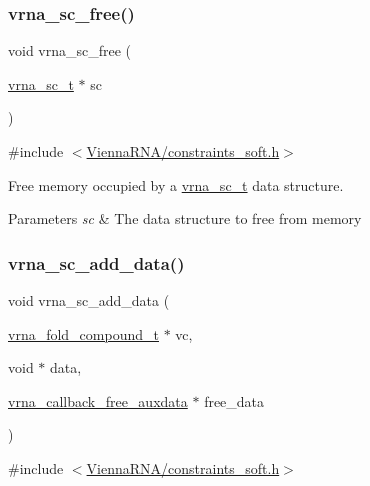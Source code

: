 \subsubsection{\texorpdfstring{vrna\+\_\+sc\+\_\+free()}{vrna\_sc\_free()}}
{\footnotesize\ttfamily void vrna\+\_\+sc\+\_\+free (\begin{DoxyParamCaption}\item[{\hyperlink{group__soft__constraints_ga75401ce219ef8dbcceb672db82d434c6}{vrna\+\_\+sc\+\_\+t} $\ast$}]{sc }\end{DoxyParamCaption})}



{\ttfamily \#include $<$\hyperlink{constraints__soft_8h}{Vienna\+R\+N\+A/constraints\+\_\+soft.\+h}$>$}



Free memory occupied by a \hyperlink{group__soft__constraints_ga75401ce219ef8dbcceb672db82d434c6}{vrna\+\_\+sc\+\_\+t} data structure. 


\begin{DoxyParams}{Parameters}
{\em sc} & The data structure to free from memory \\
\hline
\end{DoxyParams}
\mbox{\label{group__soft__constraints_ga15c6d52471ec97897e2bb7f964f5deb6}} 
\subsubsection{\texorpdfstring{vrna\+\_\+sc\+\_\+add\+\_\+data()}{vrna\_sc\_add\_data()}}
{\footnotesize\ttfamily void vrna\+\_\+sc\+\_\+add\+\_\+data (\begin{DoxyParamCaption}\item[{\hyperlink{group__fold__compound_ga1b0cef17fd40466cef5968eaeeff6166}{vrna\+\_\+fold\+\_\+compound\+\_\+t} $\ast$}]{vc,  }\item[{void $\ast$}]{data,  }\item[{\hyperlink{group__fold__compound_ga7806651f51b195013839a218b3bbd5a3}{vrna\+\_\+callback\+\_\+free\+\_\+auxdata} $\ast$}]{free\+\_\+data }\end{DoxyParamCaption})}



{\ttfamily \#include $<$\hyperlink{constraints__soft_8h}{Vienna\+R\+N\+A/constraints\+\_\+soft.\+h}$>$}



